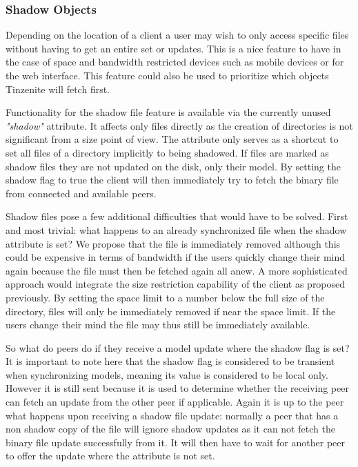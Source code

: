 \subsubsection{Shadow Objects}
\label{subs:Shadow Objects}

Depending on the location of a client a user may wish to only access specific files without having to get an entire set or updates.
This is a nice feature to have in the case of space and bandwidth restricted devices such as mobile devices or for the web interface.
This feature could also be used to prioritize which objects Tinzenite will fetch first.

Functionality for the shadow file feature is available via the currently unused \textit{"shadow"} attribute.
It affects only files directly as the creation of directories is not significant from a size point of view.
The attribute only serves as a shortcut to set all files of a directory implicitly to being shadowed.
If files are marked as shadow files they are not updated on the disk, only their model.
By setting the shadow flag to true the client will then immediately try to fetch the binary file from connected and available peers.

Shadow files pose a few additional difficulties that would have to be solved.
First and most trivial: what happens to an already synchronized file when the shadow attribute is set?
We propose that the file is immediately removed although this could be expensive in terms of bandwidth if the users quickly change their mind again because the file must then be fetched again all anew.
A more sophisticated approach would integrate the size restriction capability of the client as proposed previously.
By setting the space limit to a number below the full size of the directory, files will only be immediately removed if near the space limit.
If the users change their mind the file may thus still be immediately available.

So what do peers do if they receive a model update where the shadow flag is set?
It is important to note here that the shadow flag is considered to be transient when synchronizing models, meaning its value is considered to be local only.
However it is still sent because it is used to determine whether the receiving peer can fetch an update from the other peer if applicable.
Again it is up to the peer what happens upon receiving a shadow file update: normally a peer that has a non shadow copy of the file will ignore shadow updates as it can not fetch the binary file update successfully from it.
It will then have to wait for another peer to offer the update where the attribute is not set.

